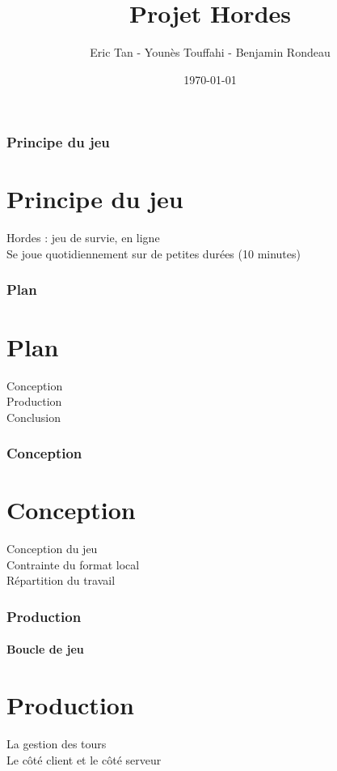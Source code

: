 \documentclass{beamer}
\begin{document}
    \title {\textbf {Projet Hordes}}
    \author{Eric Tan - Younès Touffahi - Benjamin Rondeau}
    \date{\today}
    \maketitle
    
    
    \begin{frame}
        \frametitle{Principe du jeu}
        \section{Principe du jeu}
        Hordes : jeu de survie, en ligne
        \\ Se joue quotidiennement sur de petites durées (10 minutes)
    \end{frame}
    
    
    \begin{frame}
        \frametitle{Plan}
        \section{Plan}
        Conception
        \\ Production
        \\ Conclusion
    \end{frame}
    
    
    \begin{frame}
        \frametitle{Conception}
        \section{Conception}
        Conception du jeu
        \\ Contrainte du format local
        \\ Répartition du travail
    \end{frame}
    
    
    \begin{frame}
        \frametitle{Production}
        \framesubtitle{Boucle de jeu}
        \section{Production}
        La gestion des tours
        \\ Le côté client et le côté serveur
    \end{frame}
    
\end{document}
